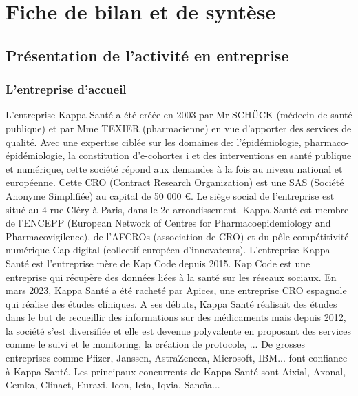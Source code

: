 \section{Fiche de bilan et de syntèse}
\subsection{Présentation de l'activité en entreprise}
\subsubsection{L'entreprise d'accueil}
L’entreprise Kappa Santé a été créée en 2003 par Mr SCHÜCK (médecin de
santé publique) et par Mme TEXIER (pharmacienne) en vue d’apporter des
services de qualité. Avec une expertise ciblée sur les domaines de:
l’épidémiologie, pharmaco- épidémiologie, la constitution d’e-cohortes i et des
interventions en santé publique et numérique, cette société répond aux
demandes à la fois au niveau national et européenne.
Cette CRO (Contract Research Organization) est une SAS (Société Anonyme
Simplifiée) au capital de 50 000 €.
Le siège social de l’entreprise est situé au 4 rue Cléry à Paris, dans le 2e
arrondissement.
Kappa Santé est membre de l’ENCEPP (European Network of Centres for
Pharmacoepidemiology and Pharmacovigilence), de l’AFCROs (association de
CRO) et du pôle compétitivité numérique Cap digital (collectif européen
d’innovateurs).
L’entreprise Kappa Santé est l’entreprise mère de Kap Code depuis 2015. Kap
Code est une entreprise qui récupère des données liées à la santé sur les
réseaux sociaux.
En mars 2023, Kappa Santé a été racheté par Apices, une entreprise CRO
espagnole qui réalise des études cliniques.
A ses débuts, Kappa Santé réalisait des études dans le but de recueillir des
informations sur des médicaments mais depuis 2012, la société s’est diversifiée
et elle est devenue polyvalente en proposant des services comme le suivi et le
monitoring, la création de protocole, ...
De grosses entreprises comme Pfizer, Janssen, AstraZeneca, Microsoft, IBM... font confiance à Kappa Santé. Les principaux concurrents de Kappa Santé sont
Aixial, Axonal, Cemka, Clinact, Euraxi, Icon, Icta, Iqvia, Sanoïa...

